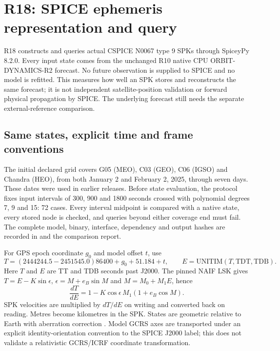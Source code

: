 \section{R18: SPICE ephemeris representation and query}
\label{sec:r18-spice}

R18 constructs and queries actual CSPICE N0067 type 9 SPKs through
SpiceyPy 8.2.0. Every input state comes from the unchanged R10 native CPU
ORBIT-DYNAMICS-R2 forecast. No future observation is supplied to SPICE and no
model is refitted. This measures how well an SPK stores and reconstructs the
same forecast; it is not independent satellite-position validation or forward
physical propagation by SPICE. The underlying forecast still needs the separate
external-reference comparison.

\subsection{Same states, explicit time and frame conventions}
The initial declared grid covers G05 (MEO), C03 (GEO), C06 (IGSO) and Chandra
(HEO), from both January 2 and February 2, 2025, through seven days. These dates
were used in earlier releases. Before state evaluation, the protocol fixes
input intervals of 300, 900 and 1800 seconds crossed with polynomial degrees
7, 9 and 15: 72 cases. Every interval midpoint is compared with a native
state, every stored node is checked, and queries beyond either coverage end
must fail. The complete model, binary, interface, dependency and output hashes
are recorded in  and the comparison report.

For GPS epoch coordinate $g_0$ and model offset $t$, use
\begin{equation}
 T=(2444244.5-2451545.0)86400+g_0+51.184+t,
 \qquad E=\mathrm{UNITIM}(T,\mathrm{TDT},\mathrm{TDB}).
\end{equation}
Here $T$ and $E$ are TT and TDB seconds past J2000. The pinned NAIF LSK gives
$T=E-K\sin\epsilon$, $\epsilon=M+e_B\sin M$ and $M=M_0+M_1E$, hence
\begin{equation}
 \frac{dT}{dE}=1-K\cos\epsilon\,M_1(1+e_B\cos M).
\end{equation}
SPK velocities are multiplied by $dT/dE$ on writing and converted back on
reading. Metres become kilometres in the SPK. States are geometric relative
to Earth with aberration correction . Model GCRS axes are transported
under an explicit identity-orientation convention to the SPICE J2000 label;
this does not validate a relativistic GCRS/ICRF coordinate transformation.

